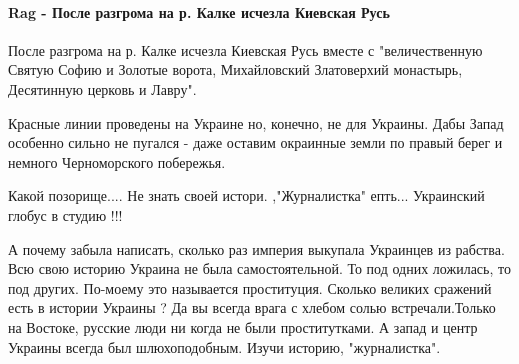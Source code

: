  
 
 
 
 
\paragraph{Rag - После разгрома на р. Калке исчезла Киевская Русь}

\begin{itemize}

 

После разгрома на р. Калке исчезла Киевская Русь вместе с "величественную
Святую Софию и Золотые ворота, Михайловский Златоверхий монастырь, Десятинную
церковь и Лавру".

Красные линии проведены на Украине но, конечно, не для Украины. Дабы Запад
особенно сильно не пугался - даже оставим окраинные земли по правый берег и
немного Черноморского побережья.


 
Какой позорище.... Не знать своей истори. ,"Журналистка" епть... Украинский
глобус в студию !!!


 

А почему забыла написать, сколько раз империя выкупала Украинцев из рабства.
Всю свою историю Украина не была самостоятельной. То под одних ложилась, то под
других. По-моему это называется проституция. Сколько великих сражений есть в
истории Украины ? Да вы всегда врага с хлебом солью встречали.Только на
Востоке, русские люди ни когда не были проститутками. А запад и центр Украины
всегда был шлюхоподобным. Изучи историю, "журналистка".


\end{itemize}
